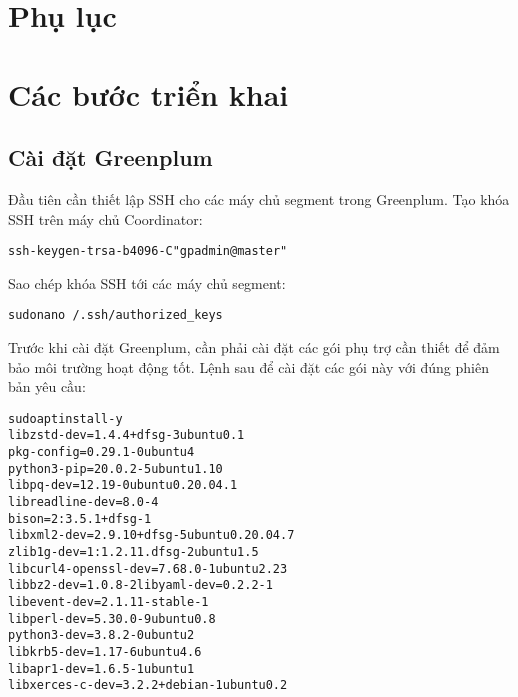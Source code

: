 
\pagebreak
\section{Phụ lục}
\appendix

\section{Các bước triển khai}

\subsection{Cài đặt Greenplum}

Đầu tiên cần thiết lập SSH cho các máy chủ segment trong Greenplum.
Tạo khóa SSH trên máy chủ Coordinator:

\begin{mdframed}[backgroundcolor=white, linecolor=black, roundcorner=5pt]
\begin{alltt}
ssh-keygen -t rsa -b 4096 -C "gpadmin@master"
\end{alltt}
\end{mdframed}

Sao chép khóa SSH tới các máy chủ segment:


\begin{mdframed}[backgroundcolor=white, linecolor=black, roundcorner=5pt]
\begin{alltt}
sudo nano ~/.ssh/authorized_keys
\end{alltt}
\end{mdframed}

Trước khi cài đặt Greenplum, cần phải cài đặt các gói phụ trợ cần thiết để đảm bảo môi trường hoạt động tốt. Lệnh sau để cài đặt các gói này với đúng phiên bản yêu cầu:

\begin{mdframed}[backgroundcolor=white, linecolor=black, roundcorner=5pt]
\begin{alltt}
sudo apt install -y 
libzstd-dev=1.4.4+dfsg-3ubuntu0.1
pkg-config=0.29.1-0ubuntu4
python3-pip=20.0.2-5ubuntu1.10
libpq-dev=12.19-0ubuntu0.20.04.1
libreadline-dev=8.0-4
bison=2:3.5.1+dfsg-1
libxml2-dev=2.9.10+dfsg-5ubuntu0.20.04.7
zlib1g-dev=1:1.2.11.dfsg-2ubuntu1.5
libcurl4-openssl-dev=7.68.0-1ubuntu2.23
libbz2-dev=1.0.8-2 libyaml-dev=0.2.2-1
libevent-dev=2.1.11-stable-1
libperl-dev=5.30.0-9ubuntu0.8
python3-dev=3.8.2-0ubuntu2
libkrb5-dev=1.17-6ubuntu4.6
libapr1-dev=1.6.5-1ubuntu1
libxerces-c-dev=3.2.2+debian-1ubuntu0.2
\end{alltt}
\end{mdframed}


